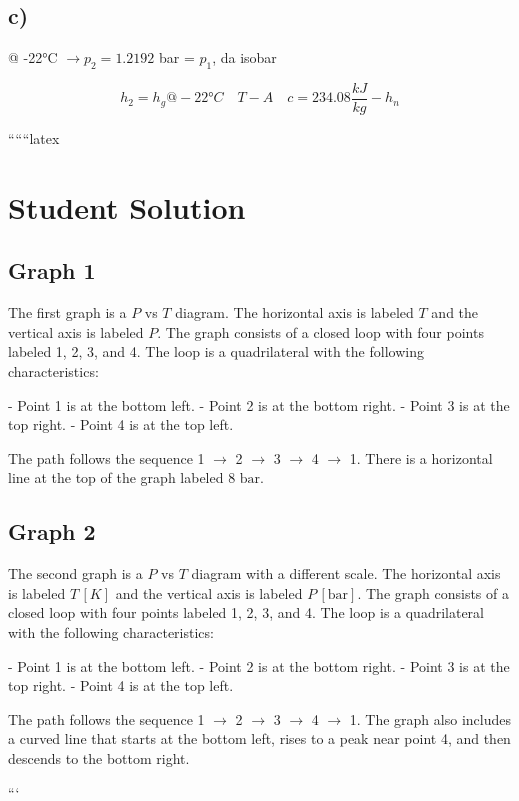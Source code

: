 

\subsection*{c)}
@ -22°C $\rightarrow p_2 = 1.2192$ bar = $p_1$, da isobar

\[
h_2 = h_g @ -22°C \quad T - A \quad c = 234.08 \frac{kJ}{kg} - h_n
\]

``````latex


\section*{Student Solution}

\subsection*{Graph 1}

The first graph is a $P$ vs $T$ diagram. The horizontal axis is labeled $T$ and the vertical axis is labeled $P$. The graph consists of a closed loop with four points labeled 1, 2, 3, and 4. The loop is a quadrilateral with the following characteristics:

- Point 1 is at the bottom left.
- Point 2 is at the bottom right.
- Point 3 is at the top right.
- Point 4 is at the top left.

The path follows the sequence 1 $\rightarrow$ 2 $\rightarrow$ 3 $\rightarrow$ 4 $\rightarrow$ 1. There is a horizontal line at the top of the graph labeled $8 \text{ bar}$.

\subsection*{Graph 2}

The second graph is a $P$ vs $T$ diagram with a different scale. The horizontal axis is labeled $T \, [K]$ and the vertical axis is labeled $P \, [\text{bar}]$. The graph consists of a closed loop with four points labeled 1, 2, 3, and 4. The loop is a quadrilateral with the following characteristics:

- Point 1 is at the bottom left.
- Point 2 is at the bottom right.
- Point 3 is at the top right.
- Point 4 is at the top left.

The path follows the sequence 1 $\rightarrow$ 2 $\rightarrow$ 3 $\rightarrow$ 4 $\rightarrow$ 1. The graph also includes a curved line that starts at the bottom left, rises to a peak near point 4, and then descends to the bottom right.

```
